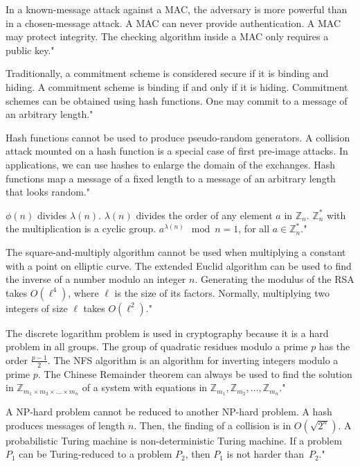 {In a known-message attack against a MAC, the adversary is more powerful than in a chosen-message attack.}
{A MAC can never provide authentication.}
{A MAC may protect integrity.}
{The checking algorithm inside a MAC only requires a public key."}

{Traditionally, a commitment scheme is considered secure if it is binding and hiding.}
{A commitment scheme is binding if and only if it is hiding.}
{Commitment schemes can be obtained using hash functions.}
{One may commit to a message of an arbitrary length."}

{Hash functions cannot be used to produce pseudo-random generators.}
{A collision attack mounted on a hash function is a special case of first pre-image attacks.}
{In applications, we can use hashes to enlarge the domain of the exchanges.}
{Hash functions map a message of a fixed length to a message of an arbitrary length that looks random."}

{$\phi(n)$ divides $\lambda(n)$.}
{$\lambda(n)$ divides the order of any element $a$ in $\mathbb{Z}_n$.}
{$\mathbb{Z}^{*}_n$ with the multiplication is a cyclic group.}
{$a^{\lambda(n)} \mod n=1$, for all $a \in \mathbb{Z}^{*}_n$."}

{The square-and-multiply algorithm cannot be used when multiplying a constant with a point on elliptic curve.}
{The extended Euclid algorithm can be used to find the inverse of a number modulo an integer $n$.}
{Generating the modulus of the RSA takes $O(\ell^4)$, where $\ell$ is the size of its factors.}
{Normally, multiplying two integers of size $\ell$ takes $O(\ell^2)$."}

{The discrete logarithm problem is used in cryptography because it is a hard problem in all groups.}
{The group of quadratic residues modulo a prime $p$ has the order $\frac{p-1}{2}$.}
{The NFS algorithm is an algorithm for inverting integers modulo a prime $p$.}
{The Chinese Remainder theorem can always be used to find the solution in $\mathbb{Z}_{m_{1} \times m_{2} \times \ldots \times m_{n}}$ of a system with equations in $\mathbb{Z}_{m_{1}}, \mathbb{Z}_{m_{2}}, \ldots, \mathbb{Z}_{m_{n}}$."}

{A NP-hard problem cannot be reduced to another NP-hard problem.}
{A hash produces messages of length $n$. Then, the finding of a collision is in $O(\sqrt{2^n})$.}
{A probabilistic Turing machine is non-deterministic Turing machine.}
{If a problem $P_1$ can be Turing-reduced to a problem $P_2$, then $P_1$ is not harder than~$P_2$."}

